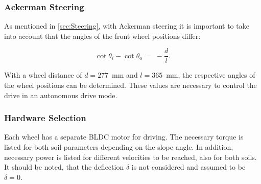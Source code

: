 \subsubsection*{Ackerman Steering}
\label{app:Ackerman}

As mentioned in \autoref{sec:Steering}, with Ackerman steering it is important to take into account that the angles of the front wheel positions differ: 

\begin{equation}
	\cot \theta_{i} - \cot \theta_\text{o} \:  = \:	- \frac{d}{l}	.
	\label{eq:Ackerman}
\end{equation}

With a wheel distance of \(d = 277\)~mm and \(l = 365\)~mm, the respective angles of the wheel positions can be determined. These values are necessary to control the drive in an autonomous drive mode.


\subsubsection*{Hardware Selection}
\label{app:Hardware}

Each wheel has a separate BLDC motor for driving. The necessary torque is listed for both soil parameters depending on the slope angle. In addition, necessary power is listed for different velocities to be reached, also for both soils. It should be noted, that the deflection \(\delta\) is not considered and assumed to be \(\delta = 0\).

